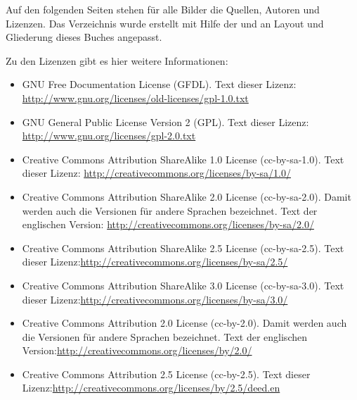 \begin{small}
Auf den folgenden Seiten stehen für alle Bilder die Quellen, Autoren und Lizenzen. Das Verzeichnis wurde erstellt mit Hilfe der  und an Layout und Gliederung dieses Buches angepasst.

Zu den Lizenzen gibt es hier weitere Informationen:

\begin{itemize}
\item GNU Free Documentation License (GFDL). Text dieser Lizenz: \newline{}\url{http://www.gnu.org/licenses/old-licenses/gpl-1.0.txt}

\item GNU General Public License Version 2 (GPL). Text dieser Lizenz: \newline{}\url{http://www.gnu.org/licenses/gpl-2.0.txt} 

\item Creative Commons Attribution ShareAlike 1.0 License (cc-by-sa-1.0). Text dieser Lizenz: \newline{}\url{http://creativecommons.org/licenses/by-sa/1.0/} 

\item Creative Commons Attribution ShareAlike 2.0 License (cc-by-sa-2.0). Damit werden auch die Versionen f\"ur andere Sprachen bezeichnet. Text der englischen Version: \newline{}\url{http://creativecommons.org/licenses/by-sa/2.0/}

\item Creative Commons Attribution ShareAlike 2.5 License (cc-by-sa-2.5). Text dieser Lizenz:\newline{}\url{http://creativecommons.org/licenses/by-sa/2.5/}

\item Creative Commons Attribution ShareAlike 3.0 License (cc-by-sa-3.0). Text dieser Lizenz:\newline{}\url{http://creativecommons.org/licenses/by-sa/3.0/}

\item Creative Commons Attribution 2.0 License (cc-by-2.0). Damit werden auch die Versionen f\"ur andere Sprachen bezeichnet. Text der englischen Version:\newline{}\url{http://creativecommons.org/licenses/by/2.0/}

\item Creative Commons Attribution 2.5 License (cc-by-2.5). Text dieser Lizenz:\newline{}\url{http://creativecommons.org/licenses/by/2.5/deed.en}


\end{itemize}
\end{small}

